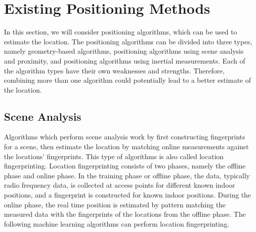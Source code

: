 \section{Existing Positioning Methods} 
In this section, we will consider positioning algorithms, which can be used to estimate the location. The positioning algorithms can be divided into three types, namely geometry-based algorithms, positioning algorithms using scene analysis and proximity, and positioning algorithms using inertial measurements. Each of the algorithm types have their own weaknesses and strengths. Therefore, combining more than one algorithm could potentially lead to a better estimate of the location.

\subsection{Scene Analysis}
\label{sec:scene_analysis}
Algorithms which perform scene analysis work by first constructing fingerprints for a scene, then estimate the location by matching online measurements against the locations' fingerprints. This type of algorithms is also called location fingerprinting. Location fingerprinting consists of two phases, namely the offline phase and online phase. In the training phase or offline phase, the data, typically radio frequency data, is collected at access points for different known indoor positions, and a fingerprint is constructed for known indoor positions. During the online phase, the real time position is estimated by pattern matching the measured data with the fingerprints of the locations from the offline phase.\cite{IPS01} The following machine learning algorithms can perform location fingerprinting.

